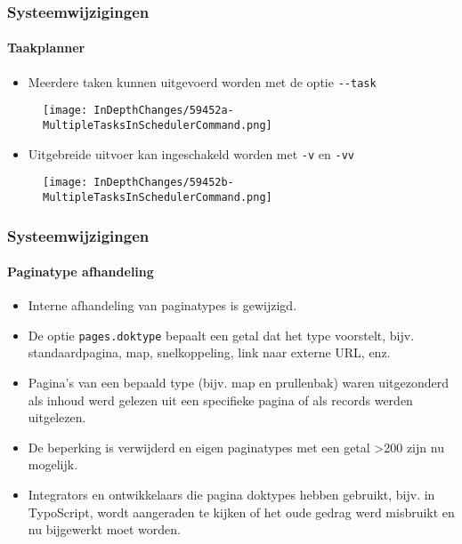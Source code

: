 
\begin{frame}[fragile]
	\frametitle{Systeemwijzigingen}
	\framesubtitle{Taakplanner}

	\lstset{basicstyle=\tiny\ttfamily}

	\begin{itemize}
		\item Meerdere taken kunnen uitgevoerd worden met de optie \texttt{-}\texttt{-}\texttt{task}
	\end{itemize}

	\begin{figure}
		\texttt{[image: InDepthChanges/59452a-MultipleTasksInSchedulerCommand.png]}
	\end{figure}

	\begin{itemize}
		\item Uitgebreide uitvoer kan ingeschakeld worden met \texttt{-}\texttt{v} en \texttt{-}\texttt{vv}
	\end{itemize}

	\begin{figure}
		\texttt{[image: InDepthChanges/59452b-MultipleTasksInSchedulerCommand.png]}
	\end{figure}

\end{frame}


\begin{frame}[fragile]
	\frametitle{Systeemwijzigingen}
	\framesubtitle{Paginatype afhandeling}

	\begin{itemize}
		\item Interne afhandeling van paginatypes is gewijzigd.
		\item De optie \texttt{pages.doktype} bepaalt een getal dat het type voorstelt,
			bijv. standaardpagina, map, snelkoppeling, link naar externe URL, enz.
		\item Pagina's van een bepaald type (bijv. map en prullenbak) waren uitgezonderd als inhoud
			werd gelezen uit een specifieke pagina of als records werden uitgelezen.
		\item De beperking is verwijderd en eigen paginatypes met een getal >200 zijn nu mogelijk.
		\item Integrators en ontwikkelaars die pagina doktypes hebben gebruikt, bijv. in TypoScript,
			wordt aangeraden te kijken of het oude gedrag werd misbruikt en nu bijgewerkt moet worden.
	\end{itemize}

\end{frame}

